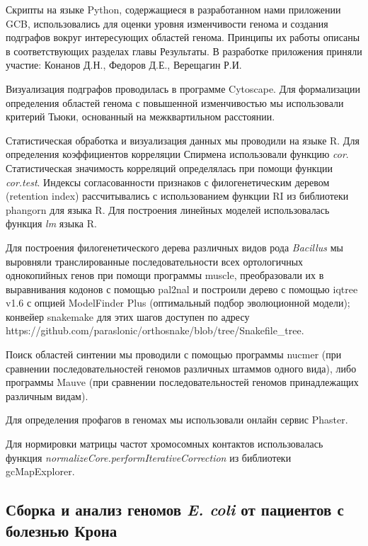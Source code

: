 Скрипты на языке Python, содержащиеся в разработанном нами приложении GCB, использовались для оценки уровня изменчивости генома и создания подграфов вокруг интересующих областей генома. Принципы их работы описаны в соответствующих разделах главы Результаты. В разработке приложения приняли участие: Конанов Д.Н., Федоров Д.Е., Верещагин Р.И.

Визуализация подграфов проводилась в программе Cytoscape. Для формализации определения областей генома с повышенной изменчивостью мы использовали критерий Тьюки, основанный на межквартильном расстоянии.

Статистическая обработка и визуализация данных мы проводили на языке R. Для определения коэффициентов корреляции Спирмена использовали функцию \textit{cor}. Статистическая значимость корреляций определялась при помощи функции \textit{cor.test}. Индексы согласованности признаков с филогенетическим деревом (retention index) рассчитывались с использованием функции RI из библиотеки phangorn для языка R. Для построения линейных моделей использовалась функция \textit{lm} языка R.

Для построения филогенетического дерева различных видов рода \textit{Bacillus} мы выровняли транслированные последовательности всех ортологичных однокопийных генов при помощи программы muscle, преобразовали их в выравнивания кодонов с помощью pal2nal и построили дерево с помощью iqtree v1.6 с опцией ModelFinder Plus (оптимальный подбор эволюционной модели); конвейер snakemake для этих шагов доступен по адресу https://github.com/paraslonic/orthosnake/blob/tree/Snakefile\_tree. 

Поиск областей синтении мы проводили с помощью программы nucmer (при сравнении последовательностей геномов различных штаммов одного вида), либо программы Mauve (при сравнении последовательностей геномов принадлежащих различным видам).

Для определения профагов в геномах мы использовали онлайн сервис Phaster. 

Для нормировки матрицы частот хромосомных контактов использовалась функция \textit{normalizeCore.performIterativeCorrection} из библиотеки gcMapExplorer. 

\subsection*{Сборка и анализ геномов \textit{E. coli} от пациентов с болезнью Крона}

